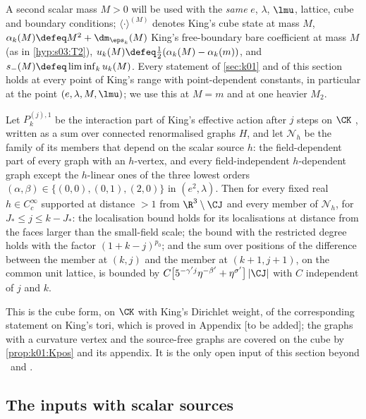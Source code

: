 A second scalar mass $M>0$ will be used with the \emph{same} $e$, $\lambda$, $\lmu$, lattice, cube and boundary conditions; $\langle\cdot\rangle^{(M)}$ denotes King's cube state at mass $M$, $\alpha_k(M)\defeq M^2+\dm_{\eps_k}(M)$ King's free-boundary bare coefficient at mass $M$ (as in \cref{hyp:s03:T2}), $u_k(M)\defeq\frac12(\alpha_k(M)-\alpha_k(m))$, and $s_-(M)\defeq\liminf_ku_k(M)$. Every statement of \cref{sec:k01} and of this section holds at every point of King's range with point-dependent constants, in particular at the point $(e,\lambda,M,\lmu)$; we use this at $M=m$ and at one heavier $M_2$.

\begin{hypothesis}\label{hyp:k02:Kh}
Let $P^{(j),1}_k$ be the interaction part of King's effective action after $j$ steps on $\CK$ \cite[(3.17)]{K1}, written as a sum over connected renormalised graphs $H$, and let $\mathcal N_h$ be the family of its members that depend on the scalar source $h$: the field-dependent part of every graph with an $h$-vertex, and every field-independent $h$-dependent graph except the $h$-linear ones of the three lowest orders $(\alpha,\beta)\in\{(0,0),(0,1),(2,0)\}$ in $(e^2,\lambda)$. Then for every fixed real $h\in C^\infty_c$ supported at distance $>1$ from $\R^3\setminus\CJ$ and every member of $\mathcal N_h$, for $J_*\le j\le k-J_*$: the localisation bound \cite[(3.39)]{K1} holds for its localisations at distance from the faces larger than the small-field scale; the bound \cite[(3.38)]{K1} with the restricted degree holds with the factor $(1+k-j)^{p_0}$; and the sum over positions of the difference between the member at $(k,j)$ and the member at $(k+1,j+1)$, on the common unit lattice, is bounded by $C\big[5^{-\gamma'j}\eta^{-\beta'}+\eta^{\sigma'}\big]\,|\CJ|$ with $C$ independent of $j$ and $k$.
\end{hypothesis}
This is the cube form, on $\CK$ with King's Dirichlet weight, of the corresponding statement on King's tori, which is proved in Appendix [to be added]; the graphs with a curvature vertex and the source-free graphs are covered on the cube by \cref{prop:k01:Kpos} and its appendix. It is the only open input of this section beyond \BALint\ and \RENorb.

\subsection{The inputs with scalar sources}\label{ssec:k02:inputs}

